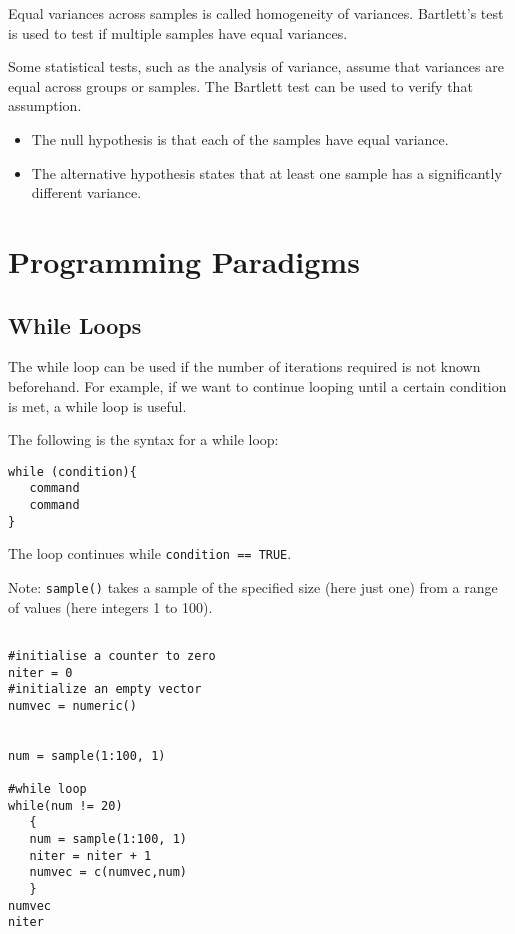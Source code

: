 \documentclass[a4paper,12pt]{article}
\begin{document}
\begin{itemize}
\begin{itemize}
Equal variances across samples is called homogeneity of variances. Bartlett's test is used to test if multiple samples have equal variances. 

Some statistical tests, such as the analysis of variance, assume that variances are equal across groups or samples.  The Bartlett test can be used to verify that assumption.

\begin{itemize}
\item The null hypothesis is that each of the samples have equal variance.
\item The alternative hypothesis states that at least one sample has a significantly different variance.
\end{itemize}



\newpage
\section{Programming Paradigms}
\subsection{While Loops}
The while loop can be used if the number of iterations required is not known beforehand. For example, if we want to continue looping until a certain condition is met, a while loop is useful.

The following is the syntax for a while loop:

\begin{verbatim}
while (condition){
   command
   command
}
\end{verbatim}
The loop continues while \texttt{condition == TRUE}.


Note: \texttt{sample()} takes a sample of the specified size (here just one) from a range of values (here integers 1 to 100).
\begin{framed}
\begin{verbatim}

#initialise a counter to zero
niter = 0		
#initialize an empty vector
numvec = numeric()


num = sample(1:100, 1)

#while loop
while(num != 20)
   {
   num = sample(1:100, 1)
   niter = niter + 1
   numvec = c(numvec,num)
   }
numvec
niter


\end{verbatim}
\end{framed}
\end{itemize}
\end{itemize}
\end{document}
